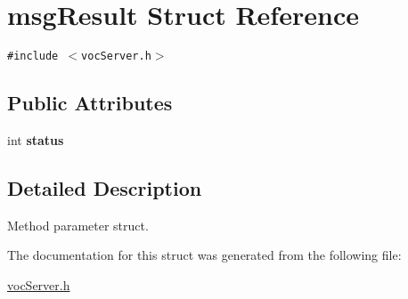 \hypertarget{structmsgResult}{
\section{msgResult Struct Reference}
\label{structmsgResult}
}
{\tt \#include $<$vocServer.h$>$}

\subsection*{Public Attributes}
\begin{CompactItemize}
\item 
\hypertarget{structmsgResult_f06e56dc28e5370ccafb4cee9dbe542a}{
int \textbf{status}}
\label{structmsgResult_f06e56dc28e5370ccafb4cee9dbe542a}

\end{CompactItemize}


\subsection{Detailed Description}
Method parameter struct. 

The documentation for this struct was generated from the following file:\begin{CompactItemize}
\item 
\hyperlink{vocServer_8h}{vocServer.h}\end{CompactItemize}
